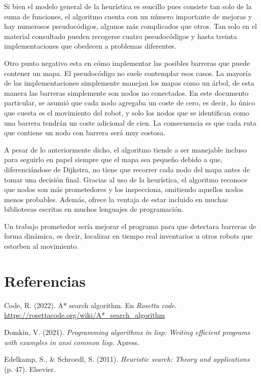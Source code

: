 \documentclass[a4paper,12pt]{article}
\begin{document}
Si bien el modelo general de la heurística es sencillo pues consiste tan solo de la suma de funciones, el algoritmo cuenta con un número importante de mejoras y hay numerosos pseudocódigos, algunos más complicados que otros. Tan solo en el material consultado pueden recogerse cuatro pseudocódigos y hasta treinta implementaciones que obedecen a problemas diferentes.

Otro punto negativo esta en cómo implementar las posibles barreras que puede contener un mapa. El pseudocódigo no suele contemplar esos casos. La mayoría de las implementaciones simplemente manejan los mapas como un árbol, de esta manera las barreras simplemente son nodos no conectados. En este documento particular, se asumió que cada nodo agregaba un coste de cero, es decir, lo único que cuesta es el movimiento del robot, y solo los nodos que se identifican como una barrera tendrán un coste adicional de cien. La consecuencia es que cada ruta que contiene un nodo con barrera será muy costosa.

A pesar de lo anteriormente dicho, el algoritmo tiende a ser manejable incluso para seguirlo en papel siempre que el mapa sea pequeño debido a que, diferenciándose de Dijkstra, no tiene que recorrer cada nodo del mapa antes de tomar una decisión final. Gracias al uso de la heurística, el algoritmo reconoce que nodos son más prometedores y los inspecciona, omitiendo aquellos nodos menos probables. Además, ofrece la ventaja de estar incluido en muchas bibliotecas escritas en muchos lenguajes de programación.

Un trabajo prometedor sería mejorar el programa para que detectara barreras de forma dinámica, es decir, localizar en tiempo real inventarios u otros robots que estorben al movimiento.

\section*{Referencias}
\label{sec:org9dbe9c2}
\begin{hangparas}{1.5em}{1}
\hypertarget{citeproc_bib_item_1}{Code, R. (2022). A* search algorithm. En \textit{Rosetta code}. \url{https://rosettacode.org/wiki/A*_search_algorithm}}

\hypertarget{citeproc_bib_item_2}{Domkin, V. (2021). \textit{Programming algorithms in lisp: Writing efficient programs with examples in ansi common lisp}. Apress.}

\hypertarget{citeproc_bib_item_3}{Edelkamp, S., \& Schroedl, S. (2011). \textit{Heuristic search: Theory and applications} (p. 47). Elsevier.}
\end{hangparas}
\end{document}
